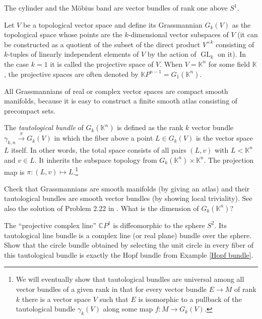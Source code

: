 \documentclass[english,letterpaper]{article}%
\numberwithin{equation}{section}
\numberwithin{figure}{section}
\numberwithin{table}{section}
\theoremstyle{definition}
\theoremstyle{definition}
\theoremstyle{definition}
\theoremstyle{plain}
\theoremstyle{plain}
\theoremstyle{plain}
\theoremstyle{plain}
\theoremstyle{remark}
\theoremstyle{remark}
\DeclareMathOperator{\GL}{GL}
\begin{document}
\begin{example}
The cylinder and the M\"obius band are vector bundles of rank one above $S^1$.
\end{example}

\begin{example}
    Let $V$ be a topological vector space and define its Grassmannian $G_k(V)$ as the topological space whose points are the $k$-dimensional vector subspaces of $V$ (it can be constructed as a quotient of the subset of the direct product $V^{\times k}$ consisting of $k$-tuples of linearly independent elements of $V$ by the action of $\GL_k$ on it). In the case $k=1$ it is called the projective space of $V$. When $V=\mathbb{K}^n$ for some field $\mathbb{K}$, the projective spaces are often denoted by $\mathbb{K}P^{n-1}=G_1(\mathbb{K}^n)$.
    
    All Grassmannians of real or complex vector spaces are compact smooth manifolds, because it is easy to construct a finite smooth atlas consisting of precompact sets.
    
    The \emph{tautological bundle} of $G_k(\mathbb{K}^n)$ is defined as the rank $k$ vector bundle $\gamma_{k,n}\overset\pi\to G_k(V)$ in which the fiber above a point $L\in G_k(V)$ is the vector space $L$ itself. In other words, the total space consists of all pairs $(L,v)$ with $L<\mathbb{K}^n$ and $v\in L$. It inherits the subspace topology from $G_k(\mathbb{K}^n)\times\mathbb{K}^n$. The projection map is $\pi:(L,v)\mapsto L$.\footnote{We will eventually show that tautological bundles are universal among all vector bundles of a given rank in that for every vector bundle $E\to M$ of rank $k$ there is a vector space $V$ such that $E$ is isomorphic to a pullback of the tautological bundle $\gamma_k(V)$ along some map $f:M\to G_k(V)$.}
\end{example}

\begin{xca}
    Check that Grassmannians are smooth manifolds (by giving an atlas) and their tautological bundles are smooth vector bundles (by showing local triviality). See also the solution of Problem 2.22 in \cite{Gadea}. What is the dimension of $G_k(\mathbb{K}^n)$?
\end{xca}

\begin{xca}
    The ``projective complex line'' $\mathbb{C}P^1$ is diffeomorphic to the sphere $S^2$. Its tautological line bundle is a complex line (or real plane) bundle over the sphere. Show that the circle bundle obtained by selecting the unit circle in every fiber of this tautological bundle is exactly the Hopf bundle from Example \ref{Hopf bundle}.
\end{xca}
\end{document}
